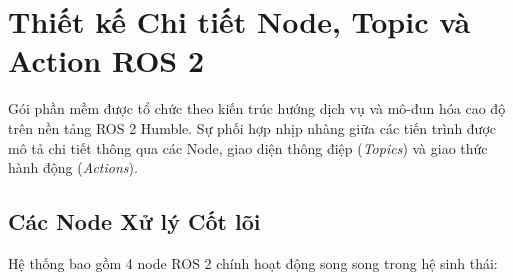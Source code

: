 \section{Thiết kế Chi tiết Node, Topic và Action ROS 2}
\label{sec:nodes_topics}

Gói phần mềm  được tổ chức theo kiến trúc hướng dịch vụ và mô-đun hóa cao độ trên nền tảng ROS 2 Humble. Sự phối hợp nhịp nhàng giữa các tiến trình được mô tả chi tiết thông qua các Node, giao diện thông điệp (\textit{Topics}) và giao thức hành động (\textit{Actions}).

\subsection{Các Node Xử lý Cốt lõi}

Hệ thống bao gồm 4 node ROS 2 chính hoạt động song song trong hệ sinh thái:

